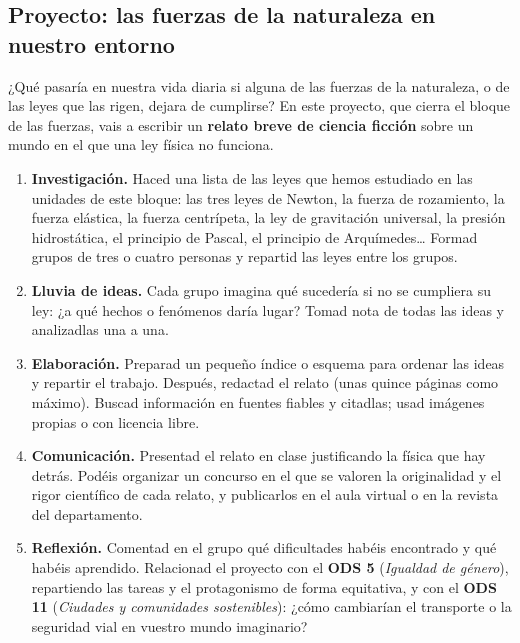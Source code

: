 \subsection[Proyecto: las fuerzas de la naturaleza]{Proyecto: las fuerzas de la naturaleza en nuestro entorno}

¿Qué pasaría en nuestra vida diaria si alguna de las fuerzas de la naturaleza, o de las leyes que las rigen, dejara de cumplirse? En este proyecto, que cierra el bloque de las fuerzas, vais a escribir un \textbf{relato breve de ciencia ficción} sobre un mundo en el que una ley física no funciona.

\begin{enumerate}[label=\numberballred]
    \item \textbf{Investigación.} Haced una lista de las leyes que hemos estudiado en las unidades de este bloque: las tres leyes de Newton, la fuerza de rozamiento, la fuerza elástica, la fuerza centrípeta, la ley de gravitación universal, la presión hidrostática, el principio de Pascal, el principio de Arquímedes\ldots{} Formad grupos de tres o cuatro personas y repartid las leyes entre los grupos.
    \item \textbf{Lluvia de ideas.} Cada grupo imagina qué sucedería si no se cumpliera su ley: ¿a qué hechos o fenómenos daría lugar? Tomad nota de todas las ideas y analizadlas una a una.
    \item \textbf{Elaboración.} Preparad un pequeño índice o esquema para ordenar las ideas y repartir el trabajo. Después, redactad el relato (unas quince páginas como máximo). Buscad información en fuentes fiables y citadlas; usad imágenes propias o con licencia libre.
    \item \textbf{Comunicación.} Presentad el relato en clase justificando la física que hay detrás. Podéis organizar un concurso en el que se valoren la originalidad y el rigor científico de cada relato, y publicarlos en el aula virtual o en la revista del departamento.
    \item \textbf{Reflexión.} Comentad en el grupo qué dificultades habéis encontrado y qué habéis aprendido. Relacionad el proyecto con el \textbf{ODS 5} (\emph{Igualdad de género}), repartiendo las tareas y el protagonismo de forma equitativa, y con el \textbf{ODS 11} (\emph{Ciudades y comunidades sostenibles}): ¿cómo cambiarían el transporte o la seguridad vial en vuestro mundo imaginario?
\end{enumerate}

